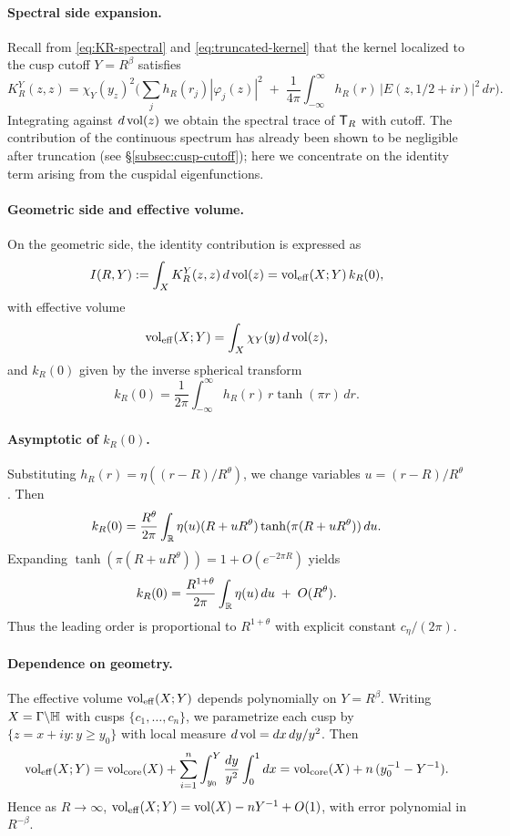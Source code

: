 \paragraph{Spectral side expansion.} 
Recall from \eqref{eq:KR-spectral} and \eqref{eq:truncated-kernel} that the kernel localized to the cusp cutoff $Y=R^\beta$ 
satisfies 
\[
K_R^Y(z,z) = \chi_Y(y_z)^2 \Bigg( \sum_j h_R(r_j)|\varphi_j(z)|^2 \;+\; \frac{1}{4\pi}\int_{-\infty}^{\infty} h_R(r) 
\,|E(z,1/2+ir)|^2 \, dr\Bigg).
\]
Integrating against $d\operatorname{vol}(z)$ we obtain the spectral trace of $\mathsf{T}_R$ with cutoff. The contribution of the continuous 
spectrum has already been shown to be negligible after truncation (see \S\ref{subsec:cusp-cutoff}); here we 
concentrate on the identity term arising from the cuspidal eigenfunctions.

\paragraph{Geometric side and effective volume.}
On the geometric side, the identity contribution is expressed as
\[
I(R,Y) := \int_X K_R^Y(z,z)\,d\operatorname{vol}(z) = \operatorname{vol}_{\mathrm{eff}}(X;Y)\, k_R(0),
\]
with effective volume
\[
\operatorname{vol}_{\mathrm{eff}}(X;Y) = \int_X \chi_Y(y)\, d\operatorname{vol}(z),
\]
and $k_R(0)$ given by the inverse spherical transform
\[
k_R(0) = \frac{1}{2\pi}\int_{-\infty}^\infty h_R(r)\, r \tanh(\pi r)\,dr.
\]

\paragraph{Asymptotic of $k_R(0)$.}
Substituting $h_R(r) = \eta((r-R)/R^\theta)$, we change variables $u=(r-R)/R^\theta$. Then
\[
k_R(0) = \frac{R^\theta}{2\pi} \int_{\mathbb{R}} \eta(u) (R+uR^\theta)\tanh(\pi(R+uR^\theta))\,du.
\]
Expanding $\tanh(\pi(R+uR^\theta))=1+O(e^{-2\pi R})$ yields
\[
k_R(0) = \frac{R^{1+\theta}}{2\pi} \int_{\mathbb{R}} \eta(u)\,du \;+\; O(R^\theta).
\]
Thus the leading order is proportional to $R^{1+\theta}$ with explicit constant $c_\eta/(2\pi)$. 

\paragraph{Dependence on geometry.}
The effective volume $\operatorname{vol}_{\mathrm{eff}}(X;Y)$ depends polynomially on $Y=R^\beta$. Writing $X=\Gamma\backslash\mathbb{H}$ 
with cusps $\{c_1,\ldots,c_n\}$, we parametrize each cusp by $\{z=x+iy: y\ge y_0\}$ with local measure $d\operatorname{vol}=dx\,dy/y^2$. 
Then
\[
\operatorname{vol}_{\mathrm{eff}}(X;Y) = \operatorname{vol}_{\mathrm{core}}(X) + \sum_{i=1}^n \int_{y_0}^Y \frac{dy}{y^2} \int_0^1 dx
= \operatorname{vol}_{\mathrm{core}}(X) + n\,(y_0^{-1}-Y^{-1}).
\]
Hence as $R\to\infty$, $\operatorname{vol}_{\mathrm{eff}}(X;Y) = \operatorname{vol}(X) - n Y^{-1} + O(1)$, with error polynomial in $R^{-\beta}$. 

